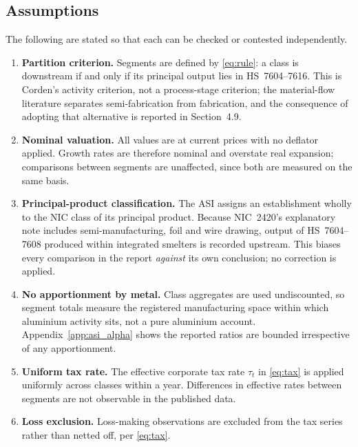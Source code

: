\subsection{Assumptions}
\label{app:asi_assumptions}

The following are stated so that each can be checked or contested independently.

\begin{enumerate}[label=\textbf{A\arabic*.}, leftmargin=2.6em]
    \item \textbf{Partition criterion.} Segments are defined by \eqref{eq:rule}: a
    class is downstream if and only if its principal output lies in HS~7604--7616.
    This is Corden's activity criterion, not a process-stage criterion; the
    material-flow literature separates semi-fabrication from fabrication, and the
    consequence of adopting that alternative is reported in Section~4.9.

    \item \textbf{Nominal valuation.} All values are at current prices with no
    deflator applied. Growth rates are therefore nominal and overstate real
    expansion; comparisons between segments are unaffected, since both are
    measured on the same basis.

    \item \textbf{Principal-product classification.} The ASI assigns an
    establishment wholly to the NIC class of its principal product. Because
    NIC~2420's explanatory note includes semi-manufacturing, foil and wire
    drawing, output of HS~7604--7608 produced within integrated smelters is
    recorded upstream. This biases every comparison in the report \emph{against}
    its own conclusion; no correction is applied.

    \item \textbf{No apportionment by metal.} Class aggregates are used
    undiscounted, so segment totals measure the registered manufacturing space
    within which aluminium activity sits, not a pure aluminium account.
    Appendix~\ref{app:asi_alpha} shows the reported ratios are bounded
    irrespective of any apportionment.

    \item \textbf{Uniform tax rate.} The effective corporate tax rate $\tau_t$ in
    \eqref{eq:tax} is applied uniformly across classes within a year. Differences
    in effective rates between segments are not observable in the published data.

    \item \textbf{Loss exclusion.} Loss-making observations are excluded from the
    tax series rather than netted off, per \eqref{eq:tax}.


\end{enumerate}
